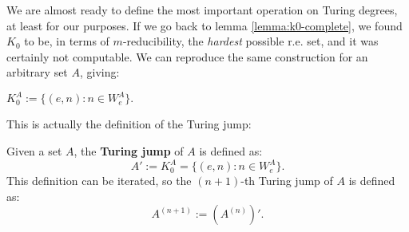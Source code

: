 \documentclass[../main.tex]{memoir}
\begin{document}
We are almost ready to define the most important operation on Turing degrees, at least for our purposes. If we go back to lemma \ref{lemma:k0-complete}, we found $K_0$ to be, in terms of $m$-reducibility, the \textit{hardest} possible r.e. set, and it was certainly not computable. We can reproduce the same construction for an arbitrary set $A$, giving:

\begin{definition}
  $K_0^A := \{(e, n): n \in W_e^A\}.$
\end{definition}

This is actually the definition of the Turing jump:

\begin{definition}
  Given a set $A$, the \textbf{Turing jump} of $A$ is defined as:
  \[ A' := K_0^A = \{(e, n): n \in W_e^A\}. \]
  This definition can be iterated, so the $(n + 1)$-th Turing jump of $A$ is defined as:
  \[ A^{(n + 1)} := (A^{(n)})'. \]
\end{definition}
\end{document}
